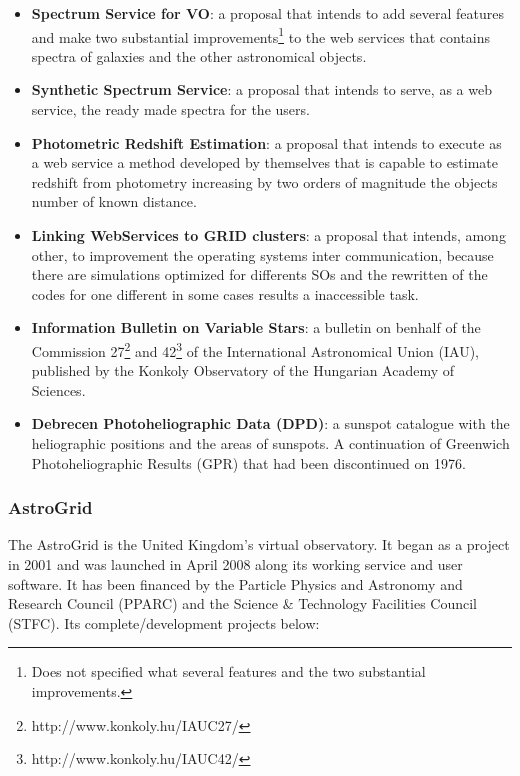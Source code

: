 \begin{itemize}
\item \textbf{Spectrum Service for VO}:
a proposal that intends to add several features and make two substantial
improvements\footnote{Does not specified what several features and the two
substantial improvements.} to the web services that contains spectra of galaxies
and the other astronomical objects.

\item \textbf{Synthetic Spectrum Service}:
a proposal that intends to serve, as a web service, the ready made spectra for
the users.

\item \textbf{Photometric Redshift Estimation}:
a proposal that intends to execute as a web service a method developed by
themselves that is capable to estimate redshift from photometry increasing by
two orders of magnitude the objects number of known distance. 

\item \textbf{Linking WebServices to GRID clusters}:
a proposal that intends, among other, to improvement the operating systems inter
communication, because there are simulations optimized for differents SOs and
the rewritten of the codes for one different in some cases results a
inaccessible task.

\item \textbf{Information Bulletin on Variable Stars}:
a bulletin on benhalf of the Commission
27\footnote{http://www.konkoly.hu/IAUC27/} and
42\footnote{http://www.konkoly.hu/IAUC42/} of the International Astronomical
Union (IAU), published by the Konkoly Observatory of the Hungarian Academy of
Sciences. 

\item \textbf{Debrecen Photoheliographic Data (DPD)}:
a sunspot catalogue with the heliographic positions and the areas of sunspots. A
continuation of Greenwich Photoheliographic Results (GPR) that had been
discontinued on 1976.
\end{itemize}

\subsubsection{AstroGrid}
The AstroGrid \cite{website:astrogrid-home} is the United Kingdom's virtual
observatory. It began as a project in 2001 and was launched in April 2008 along
its working service and user software. It has been financed by the Particle
Physics and Astronomy and Research Council (PPARC) and the Science \& Technology
Facilities Council (STFC). Its complete/development projects below:

